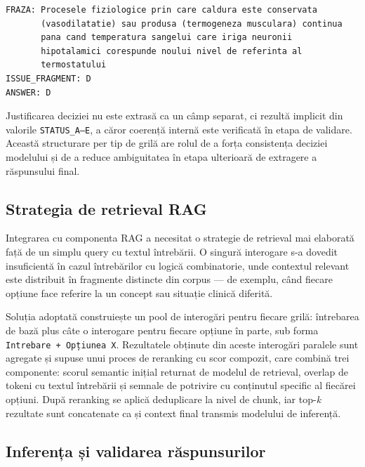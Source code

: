 \documentclass[12pt, a4paper, oneside, romanian]{teza-upb}
\begin{document}
\begin{center}
\begin{minipage}{0.78\textwidth}
\begin{lstlisting}[numbers=none]
FRAZA: Procesele fiziologice prin care caldura este conservata
       (vasodilatatie) sau produsa (termogeneza musculara) continua
       pana cand temperatura sangelui care iriga neuronii
       hipotalamici corespunde noului nivel de referinta al
       termostatului
ISSUE_FRAGMENT: D
ANSWER: D
\end{lstlisting}
\end{minipage}
\end{center}

Justificarea deciziei nu este extrasă ca un câmp separat, ci rezultă implicit din valorile \texttt{STATUS\_A--E}, a căror coerență internă este verificată în etapa de validare. Această structurare per tip de grilă are rolul de a forța consistența deciziei modelului și de a reduce ambiguitatea în etapa ulterioară de extragere a răspunsului final.

\subsection{Strategia de retrieval RAG}

Integrarea cu componenta RAG a necesitat o strategie de retrieval mai elaborată față de un simplu query cu textul întrebării. O singură interogare s-a dovedit insuficientă în cazul întrebărilor cu logică combinatorie, unde contextul relevant este distribuit în fragmente distincte din corpus --- de exemplu, când fiecare opțiune face referire la un concept sau situație clinică diferită.

Soluția adoptată construiește un pool de interogări pentru fiecare grilă: întrebarea de bază plus câte o interogare pentru fiecare opțiune în parte, sub forma \texttt{Intrebare + Opțiunea X}. Rezultatele obținute din aceste interogări paralele sunt agregate și supuse unui proces de reranking cu scor compozit, care combină trei componente: scorul semantic inițial returnat de modelul de retrieval, overlap de tokeni cu textul întrebării și semnale de potrivire cu conținutul specific al fiecărei opțiuni. După reranking se aplică deduplicare la nivel de chunk, iar top-\textit{k} rezultate sunt concatenate ca și context final transmis modelului de inferență.

\subsection{Inferența și validarea răspunsurilor}
\end{document}
